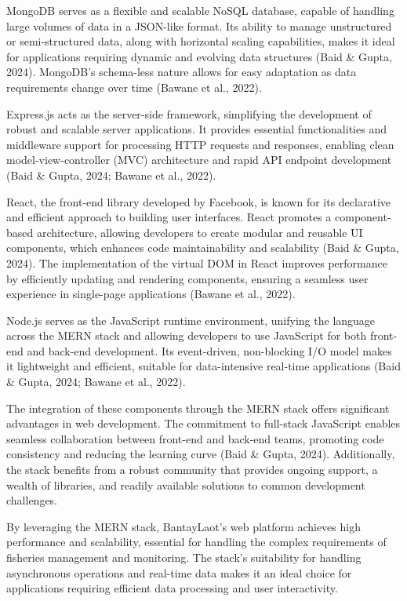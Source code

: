 \documentclass[journal]{IEEEtran}
\begin{document}
MongoDB serves as a flexible and scalable NoSQL database, capable of handling large volumes of data in a JSON-like format. Its ability to manage unstructured or semi-structured data, along with horizontal scaling capabilities, makes it ideal for applications requiring dynamic and evolving data structures (Baid \& Gupta, 2024). MongoDB's schema-less nature allows for easy adaptation as data requirements change over time (Bawane et al., 2022).

Express.js acts as the server-side framework, simplifying the development of robust and scalable server applications. It provides essential functionalities and middleware support for processing HTTP requests and responses, enabling clean model-view-controller (MVC) architecture and rapid API endpoint development (Baid \& Gupta, 2024; Bawane et al., 2022).

React, the front-end library developed by Facebook, is known for its declarative and efficient approach to building user interfaces. React promotes a component-based architecture, allowing developers to create modular and reusable UI components, which enhances code maintainability and scalability (Baid \& Gupta, 2024). The implementation of the virtual DOM in React improves performance by efficiently updating and rendering components, ensuring a seamless user experience in single-page applications (Bawane et al., 2022).

Node.js serves as the JavaScript runtime environment, unifying the language across the MERN stack and allowing developers to use JavaScript for both front-end and back-end development. Its event-driven, non-blocking I/O model makes it lightweight and efficient, suitable for data-intensive real-time applications (Baid \& Gupta, 2024; Bawane et al., 2022).

The integration of these components through the MERN stack offers significant advantages in web development. The commitment to full-stack JavaScript enables seamless collaboration between front-end and back-end teams, promoting code consistency and reducing the learning curve (Baid \& Gupta, 2024). Additionally, the stack benefits from a robust community that provides ongoing support, a wealth of libraries, and readily available solutions to common development challenges.

By leveraging the MERN stack, BantayLaot's web platform achieves high performance and scalability, essential for handling the complex requirements of fisheries management and monitoring. The stack's suitability for handling asynchronous operations and real-time data makes it an ideal choice for applications requiring efficient data processing and user interactivity.
\end{document}
